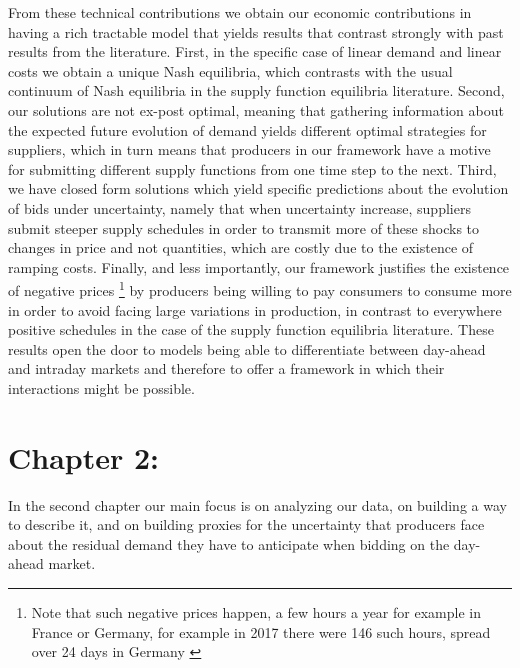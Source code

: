 From these technical contributions we obtain our economic contributions in having a rich tractable model that yields results that contrast strongly with past results from the literature. First, in the specific case of linear demand and linear costs we obtain a unique Nash equilibria, which contrasts with the usual continuum of Nash equilibria in the supply function equilibria literature. Second, our solutions are not ex-post optimal, meaning that gathering information about the expected future evolution of demand yields different optimal strategies for suppliers, which in turn means that producers in our framework have a motive for submitting different supply functions from one time step to the next. Third, we have closed form solutions which yield specific predictions about the evolution of bids under uncertainty, namely that when uncertainty increase, suppliers submit steeper supply schedules in order to transmit more of these shocks to changes in price and not quantities, which are costly due to the existence of ramping costs. Finally, and less importantly, our framework justifies the existence of negative prices \footnote{Note that such negative prices happen, a few hours a year for example in France or Germany, for example in 2017 there were 146 such hours, spread over 24 days in Germany \cite{epexnegP}} by producers being willing to pay consumers to consume more in order to avoid facing large variations in production, in contrast to everywhere positive schedules in the case of the supply function equilibria literature. These results open the door to models being able to differentiate between day-ahead and intraday markets and therefore to offer a framework in which their interactions might be possible.\\

\section*{Chapter 2: }

In the second chapter our main focus is on analyzing our data, on building a way to describe it, and on building proxies for the uncertainty that producers face about the residual demand they have to anticipate when bidding on the day-ahead market. \\

